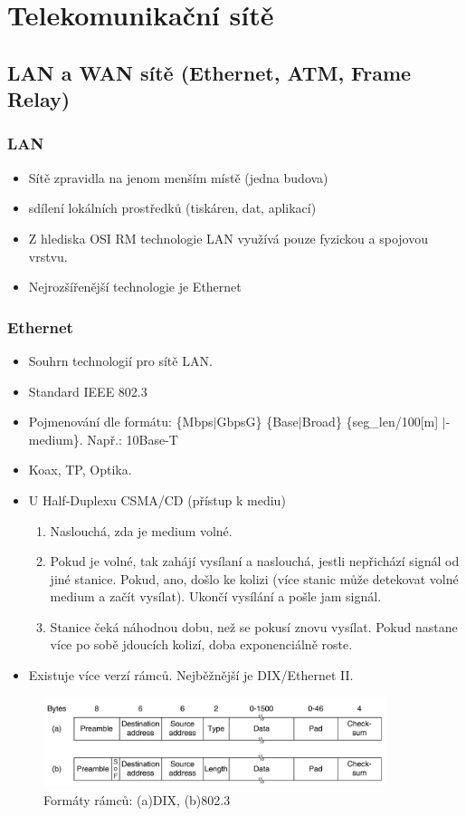 \documentclass[10pt,a4paper]{article}
\begin{document}
\newpage
\section{Telekomunikační sítě}
\subsection{LAN a WAN sítě (Ethernet, ATM, Frame Relay)}
\subsubsection{LAN}
\begin{itemize}
\item Sítě zpravidla na jenom menším místě (jedna budova)
\item sdílení lokálních prostředků (tiskáren, dat, aplikací)
\item Z hlediska OSI RM technologie LAN využívá pouze fyzickou a spojovou vrstvu.
\item Nejrozšířenější technologie je Ethernet
\end{itemize}

\subsubsection{Ethernet} \label{sec:ethernet}
\begin{itemize}
\item Souhrn technologií pro sítě LAN.
\item Standard IEEE 802.3
\item Pojmenování dle formátu: \{Mbps$|$GbpsG\} \{Base$|$Broad\} \{seg\_{}len/100[m] $|$-medium\}. Např.: 10Base-T
\item Koax, TP, Optika.
\item U Half-Duplexu CSMA/CD (přístup k mediu)
\begin{enumerate}
\item Naslouchá, zda je medium volné.
\item Pokud je volné, tak zahájí vysílaní a naslouchá, jestli nepřichází signál od jiné stanice. Pokud, ano, došlo ke kolizi (více stanic může detekovat volné medium a začít vysílat). Ukončí vysílání a pošle jam signál.
\item Stanice čeká náhodnou dobu, než se pokusí znovu vysílat. Pokud nastane více po sobě jdoucích kolizí, doba exponenciálně roste.
\end{enumerate}
\item Existuje více verzí rámců. Nejběžnější je DIX/Ethernet II.
\end{itemize}
\begin{figure}[ht]
    \centering
    \includegraphics[width=10cm]{802frameFormat.jpg}
    \caption{Formáty rámců: (a)DIX, (b)802.3}
    \label{fig:802frameFormat}
\end{figure}
\end{document}
